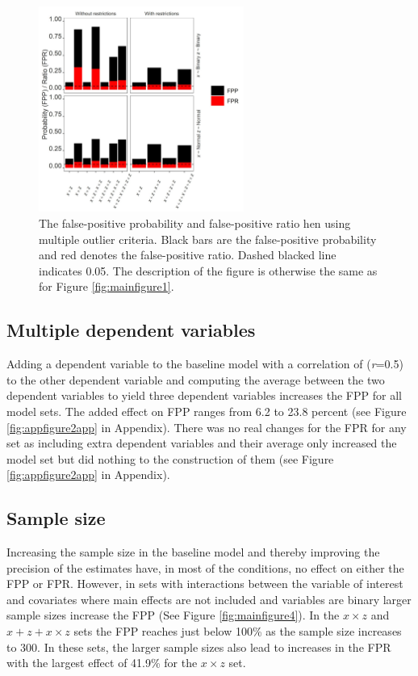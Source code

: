 \begin{figure}[hbt!]
\includegraphics[width=0.6\textwidth]{R/Analysis/Result/Figures/Figure1B.jpeg}
\centering
\caption{The false-positive probability and false-positive ratio hen using multiple outlier criteria. Black bars are the false-positive probability and red denotes the false-positive ratio. Dashed blacked line indicates 0.05. The description of the figure is otherwise the same as for Figure \ref{fig:mainfigure1}.}
\label{fig:mainfigure3}
\end{figure}

\subsection{Multiple dependent variables}
Adding a dependent variable to the baseline model with a correlation of (\textit{r}=0.5) to the other dependent variable and computing the average between the two dependent variables to yield three dependent variables increases the FPP for all model sets. The added effect on FPP ranges from 6.2 to 23.8 percent (see Figure \ref{fig:appfigure2app} in Appendix). There was no real changes for the FPR for any set as including extra dependent variables and their average only increased the model set but did nothing to the construction of them (see Figure \ref{fig:appfigure2app} in Appendix).   

\subsection{Sample size}
Increasing the sample size in the baseline model and thereby improving the precision of the estimates have, in most of the conditions, no effect on either the FPP or FPR. However, in sets with interactions between the variable of interest and covariates where main effects are not included and variables are binary larger sample sizes increase the FPP (See Figure \ref{fig:mainfigure4}). In the $x \times z$ and $x + z+ x \times z$ sets the FPP reaches just below 100\% as the sample size increases to 300. In these sets, the larger sample sizes also lead to increases in the FPR with the largest effect of 41.9\% for the $x \times z$ set.  


